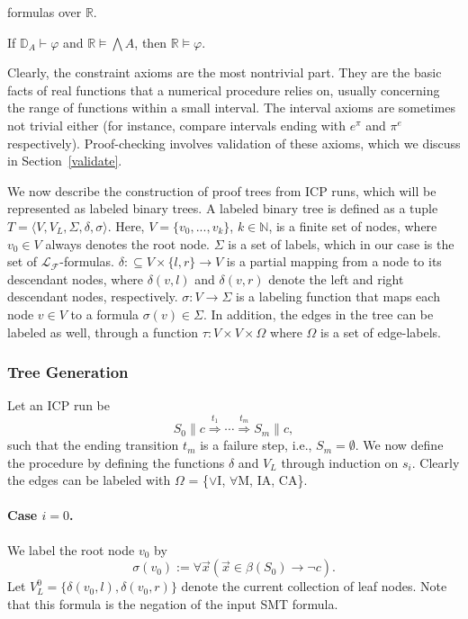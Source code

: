 \documentclass[envcountsect]{llncs}
\begin{document}
formulas over $\mathbb{R}$.
\begin{proposition}[Soundness] If $\mathbb{D}_A\vdash \varphi$ and
$\mathbb{R}\models \bigwedge A$, then $\mathbb{R}\models \varphi$.
\end{proposition}
\begin{remark}
 Clearly, the constraint axioms are the most nontrivial part. They are the
basic facts of real functions that a numerical procedure relies on, usually
concerning the range of functions within a small interval. The interval axioms
are sometimes not trivial either (for instance, compare intervals ending with
$e^{\pi}$ and $\pi^e$ respectively).  Proof-checking involves validation of
these axioms, which we discuss in Section~\ref{validate}.
\end{remark}

We now describe the construction of proof trees from ICP runs, which will be
represented as labeled binary trees. A labeled binary tree is defined as a
tuple $T =
\langle V, V_L,  \Sigma, \delta, \sigma\rangle$. Here, $V = \{v_0, ..., v_k\}$,
$k\in \mathbb{N}$, is a finite set of nodes, where $v_0\in V$ always denotes the
root
node. $\Sigma$ is a set of labels, which in our case is the set of
$\mathcal{L}_\mathcal{F}$-formulas. $\delta:\subseteq V\times \{l,r\}
\rightarrow V$ is a
partial mapping from a node to its descendant nodes, where $\delta(v, l)$ and
$\delta(v, r)$ denote the left and right descendant nodes, respectively.
$\sigma: V\rightarrow \Sigma$ is a labeling function that maps each node
$v\in V$ to a formula $\sigma(v) \in \Sigma$. In addition, the edges in the
tree can be labeled as well, through a function $\tau: V\times V\times \Omega$
where $\Omega$ is a set of edge-labels.

\subsubsection{Tree Generation} Let an ICP run be
$$S_0\parallel c\stackrel{t_1}{\Longrightarrow}\cdots
\stackrel{t_m}{\Longrightarrow} S_m\parallel c,$$
such that the ending transition $t_m$ is a failure step, i.e., $S_m=\emptyset$.
We now define the procedure by defining the functions $\delta$ and
$V_L$ through induction on $s_i$. Clearly the edges can be labeled with
$\Omega$ = \{{$\vee$I}, $\forall$M, IA, CA\}.

\paragraph{Case $i= 0$.} We label the root node $v_0$ by
$$\sigma(v_0) := \forall \vec x( \vec x\in \beta(S_0) \rightarrow \neg c).$$
Let $V_L^0= \{\delta(v_0,l), \delta(v_0, r)\}$ denote the current
collection of leaf nodes. Note that this formula is the negation of the input
SMT formula.
\end{document}

